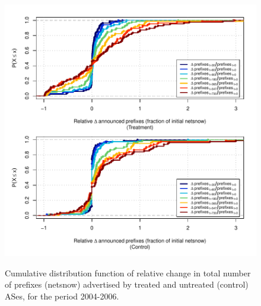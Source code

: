 \clearpage
\vspace*{16pt}
\begin{figure}[H]
\begin{centering}
\begin{singlespace}
\captionsetup{list=no}
    \includegraphics[width=6in]{figures/behavior-rel_netsnow-2004_2006-corr.pdf}
    \vspace{-2em}\\
    \caption{Cumulative distribution function of relative change in total
    number of prefixes (netsnow) advertised by treated and untreated (control)
    ASes, for the period 2004-2006.}
\end{singlespace}
\end{centering}
\end{figure}

